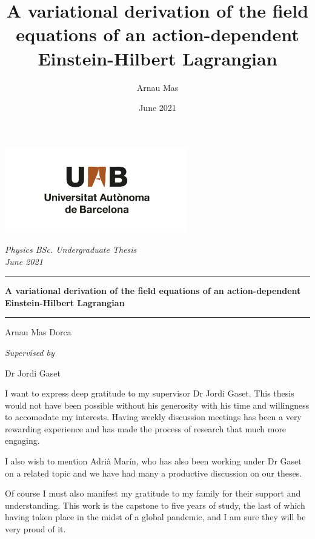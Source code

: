 \documentclass[12pt, oneside]{book}
\title{A variational derivation of the field equations of an action-dependent
	Einstein-Hilbert Lagrangian}
\author{Arnau Mas}
\date{June 2021}
\begin{document}
\begin{titlepage}
	\centering \sffamily

	\vspace*{2cm}

	\includegraphics[width = 8cm]{logo-uab}

	\vspace{2cm}

	{\Large \itshape Physics BSc. Undergraduate Thesis} \\
	{\large \itshape June 2021}

	\vspace{10pt}
	\hrule
	\vspace{10pt}
	{\bfseries \Large A variational derivation of the field equations of an action-dependent
	Einstein-Hilbert Lagrangian}

	\vspace{10pt}
	\hrule		
	\vspace{2cm}

	{\Large Arnau Mas Dorca}

	\vspace{1cm}
	{\large \itshape Supervised by}

	{\Large Dr Jordi Gaset}
\end{titlepage}

\pagestyle{plain}
\frontmatter
\hspace{0pt}
\vfill

\begin{itshape}
	I want to express deep gratitude to my supervisor Dr Jordi Gaset. This thesis would not
	have been possible without his generosity with his time and willingness to accomodate
	my interests. Having weekly discussion meetings has been a very rewarding experience and
	has made the process of research that much more engaging. 

	I also wish to mention Adrià Marín, who has also been working under Dr Gaset on a
	related topic and we have had many a productive discussion on our theses. 

	Of course I must also manifest my gratitude to my family for their support and
	understanding. This work is the capstone to five years of study, the last of which
	having taken place in the midst of a global pandemic, and I am sure they will be very
	proud of it. 
\end{itshape}
\end{document}
